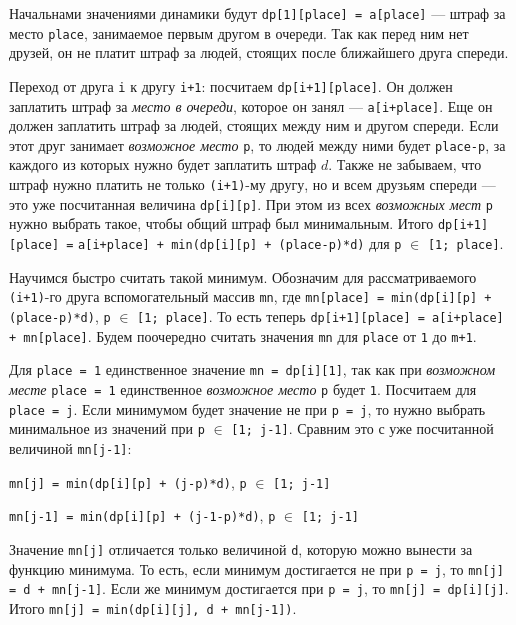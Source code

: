 \documentclass[12pt]{article}
\theoremstyle{definition}
\begin{document}
Начальнами значениями динамики будут \texttt{dp[1][place] = a[place]} --- штраф за место \texttt{place}, занимаемое первым другом в очереди. Так как перед ним нет друзей, он не платит штраф за людей, стоящих после ближайшего друга спереди.

Переход от друга \texttt{i} к другу \texttt{i+1}: посчитаем \texttt{dp[i+1][place]}. Он должен заплатить штраф за \textit{место в очереди}, которое он занял --- \texttt{a[i+place]}. Еще он должен заплатить штраф за людей, стоящих между ним и другом спереди. Если этот друг занимает \textit{возможное место} \texttt{p}, то людей между ними будет \texttt{place-p}, за каждого из которых нужно будет заплатить штраф $d$. Также не забываем, что штраф нужно платить не только \texttt{(i+1)}-му другу, но и всем друзьям спереди --- это уже посчитанная величина \texttt{dp[i][p]}. При этом из всех \textit{возможных мест} \texttt{p} нужно выбрать такое, чтобы общий штраф был минимальным. Итого 
\texttt{dp[i+1][place] =} \newline 
\texttt{a[i+place] + min(dp[i][p] + (place-p)*d)} для 
\texttt{p} $\in$ \texttt{[1; place]}.

Научимся быстро считать такой минимум. Обозначим для рассматриваемого \texttt{(i+1)}-го друга вспомогательный массив \texttt{mn}, где \texttt{mn[place] = min(dp[i][p] + (place-p)*d)}, \texttt{p} $\in$ \texttt{[1; place]}. То есть теперь \texttt{dp[i+1][place] = a[i+place] + mn[place]}. Будем поочередно считать значения \texttt{mn} для \texttt{place} от \texttt{1} до \texttt{m+1}. 

Для \texttt{place = 1} единственное значение \texttt{mn = dp[i][1]}, так как при \textit{возможном месте} \texttt{place = 1} единственное \textit{возможное место} \texttt{p} будет \texttt{1}. Посчитаем для \texttt{place = j}. Если минимумом будет значение не при \texttt{p = j}, то нужно выбрать минимальное из значений при \texttt{p} $\in$ \texttt{[1; j-1]}. Сравним это с уже посчитанной величиной \texttt{mn[j-1]}:

\;
\texttt{mn[j] = min(dp[i][p] + (j-p)*d)}, \;\texttt{p} $\in$ \texttt{[1; j-1]}

\texttt{mn[j-1] = min(dp[i][p] + (j-1-p)*d)}, \;\texttt{p} $\in$ \texttt{[1; j-1]}

\;
Значение \texttt{mn[j]} отличается только величиной \texttt{d}, которую можно вынести за функцию минимума. То есть, если минимум достигается не при \texttt{p = j}, то \texttt{mn[j] = d + mn[j-1]}.  Если же минимум достигается при \texttt{p = j}, то \texttt{mn[j] = dp[i][j]}. Итого \texttt{mn[j] = min(dp[i][j], d + mn[j-1])}.
\end{document}
